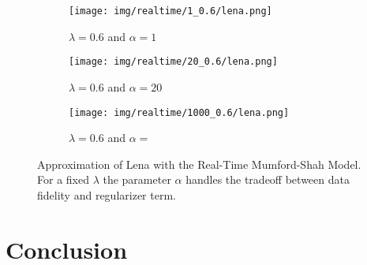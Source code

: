 \documentclass{scrreprt}
\begin{document}
    \begin{figure}[ht]
        \centering
        \begin{subfigure}[b]{0.3\textwidth}
            \texttt{[image: img/realtime/1\_0.6/lena.png]}
            \caption{$\lambda = 0.6$ and $\alpha = 1$}
            \label{fig:realtime_1_0.6_lena}
        \end{subfigure}
        \begin{subfigure}[b]{0.3\textwidth}
            \texttt{[image: img/realtime/20\_0.6/lena.png]}
            \caption{$\lambda = 0.6$ and $\alpha = 20$}
            \label{fig:realtime_20_0.6_lena}
        \end{subfigure}
        \begin{subfigure}[b]{0.3\textwidth}
            \texttt{[image: img/realtime/1000\_0.6/lena.png]}
            \caption{$\lambda = 0.6$ and $\alpha = $}
            \label{fig:realtime_1000_0.6_lena}
        \end{subfigure}
        \caption{Approximation of Lena with the Real-Time Mumford-Shah Model. For a fixed $\lambda$ the parameter $\alpha$ handles the tradeoff between data fidelity and regularizer term.}
        \label{fig:realtime_lena_compare}
    \end{figure}



\chapter{Conclusion} %
\label{cha:conclusion}





\end{document}

